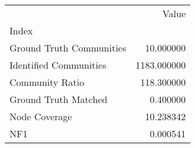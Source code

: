 \begin{tabular}{lr}
\toprule
{} &        Value \\
Index                    &              \\
\midrule
Ground Truth Communities &    10.000000 \\
Identified Communities   &  1183.000000 \\
Community Ratio          &   118.300000 \\
Ground Truth Matched     &     0.400000 \\
Node Coverage            &    10.238342 \\
NF1                      &     0.000541 \\
\bottomrule
\end{tabular}
